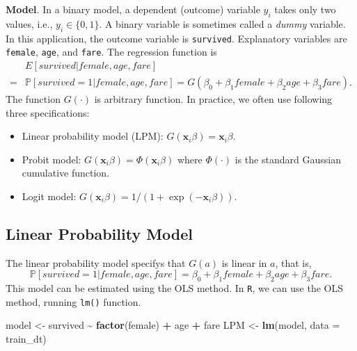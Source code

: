 \documentclass[
  12pt,
]{article}
\newenvironment{Shaded}{\begin{snugshade}}{\end{snugshade}}
\newcommand{\DataTypeTok}[1]{\textcolor[rgb]{0.13,0.29,0.53}{#1}}
\newcommand{\KeywordTok}[1]{\textcolor[rgb]{0.13,0.29,0.53}{\textbf{#1}}}
\newcommand{\NormalTok}[1]{#1}
\newcommand{\OperatorTok}[1]{\textcolor[rgb]{0.81,0.36,0.00}{\textbf{#1}}}
\newcommand{\StringTok}[1]{\textcolor[rgb]{0.31,0.60,0.02}{#1}}
\providecommand{\tightlist}{%
  \setlength{\itemsep}{0pt}\setlength{\parskip}{0pt}}
\begin{document}
\noindent \textbf{Model}. In a binary model, a dependent (outcome)
variable \(y_i\) takes only two values, i.e., \(y_i \in \{0, 1\}\). A
binary variable is sometimes called a \emph{dummy} variable. In this
application, the outcome variable is \texttt{survived}. Explanatory
variables are \texttt{female}, \texttt{age}, and \texttt{fare}. The
regression function is \begin{equation*}
  \begin{split}
    &E[survived | female, age, fare] \\
    =& \mathbb{P}[survived = 1 | female, age, fare]
    = G(\beta_0 + \beta_1 female + \beta_2 age + \beta_3 fare).
  \end{split}
\end{equation*} The function \(G(\cdot)\) is arbitrary function. In
practice, we often use following three specifications:

\begin{itemize}
\tightlist
\item
  Linear probability model (LPM):
  \(G(\mathbf{x}_i \beta) = \mathbf{x}_i \beta\).
\item
  Probit model: \(G(\mathbf{x}_i \beta) = \Phi(\mathbf{x}_i \beta)\)
  where \(\Phi(\cdot)\) is the standard Gaussian cumulative function.
\item
  Logit model:
  \(G(\mathbf{x}_i \beta) = 1/(1 + \exp(-\mathbf{x}_i \beta))\).
\end{itemize}

\hypertarget{linear-probability-model}{%
\subsection{Linear Probability Model}\label{linear-probability-model}}

The linear probability model specifys that \(G(a)\) is linear in \(a\),
that is, \begin{equation*}
  \mathbb{P}[survived = 1 | female, age, fare]
  = \beta_0 + \beta_1 female + \beta_2 age + \beta_3 fare.
\end{equation*} This model can be estimated using the OLS method. In
\texttt{R}, we can use the OLS method, running \texttt{lm()} function.

\begin{Shaded}
\begin{Highlighting}[]
\NormalTok{model \textless{}{-}}\StringTok{ }\NormalTok{survived }\OperatorTok{\textasciitilde{}}\StringTok{ }\KeywordTok{factor}\NormalTok{(female) }\OperatorTok{+}\StringTok{ }\NormalTok{age }\OperatorTok{+}\StringTok{ }\NormalTok{fare}
\NormalTok{LPM \textless{}{-}}\StringTok{ }\KeywordTok{lm}\NormalTok{(model, }\DataTypeTok{data =}\NormalTok{ train\_dt)}
\end{Highlighting}
\end{Shaded}
\end{document}
